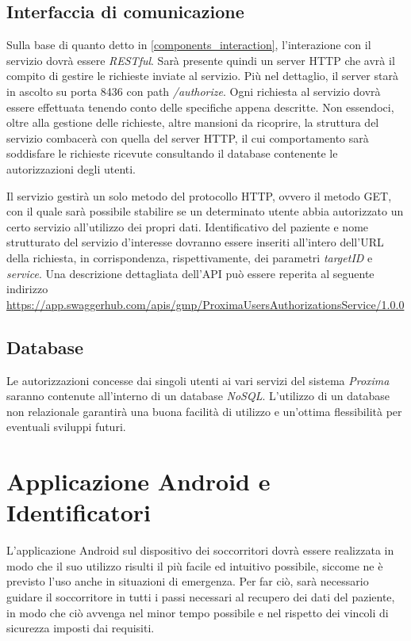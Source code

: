 \documentclass[a4paper,12pt]{report}
\begin{document}
\subsection{Interfaccia di comunicazione}

Sulla base di quanto detto in \autoref{components_interaction}, l'interazione con il servizio dovrà essere \emph{RESTful}. Sarà presente quindi un server HTTP che avrà il compito di gestire le richieste inviate al servizio. Più nel dettaglio, il server starà in ascolto su porta 8436 con path \emph{/authorize}. Ogni richiesta al servizio dovrà essere effettuata tenendo conto delle specifiche appena descritte. Non essendoci, oltre alla gestione delle richieste, altre mansioni da ricoprire, la struttura del servizio combacerà con quella del server HTTP, il cui comportamento sarà soddisfare le richieste ricevute consultando il database contenente le autorizzazioni degli utenti.

Il servizio gestirà un solo metodo del protocollo HTTP, ovvero il metodo GET, con il quale sarà possibile stabilire se un determinato utente abbia autorizzato un certo servizio all'utilizzo dei propri dati. Identificativo del paziente e nome strutturato del servizio d'interesse dovranno essere inseriti all'intero dell'URL della richiesta, in corrispondenza, rispettivamente, dei parametri \emph{targetID} e \emph{service}. Una descrizione dettagliata dell'API può essere reperita al seguente indirizzo \url{https://app.swaggerhub.com/apis/gmp/ProximaUsersAuthorizationsService/1.0.0}

\subsection{Database}

Le autorizzazioni concesse dai singoli utenti ai vari servizi del sistema \emph{Proxima} saranno contenute all'interno di un database \emph{NoSQL}. L'utilizzo di un database non relazionale garantirà una buona facilità di utilizzo e un'ottima flessibilità per eventuali sviluppi futuri.

\section{Applicazione Android e Identificatori} \label{design_app}

L'applicazione Android sul dispositivo dei soccorritori dovrà essere realizzata in modo che il suo utilizzo risulti il più facile ed intuitivo possibile, siccome ne è previsto l'uso anche in situazioni di emergenza. Per far ciò, sarà necessario guidare il soccorritore in tutti i passi necessari al recupero dei dati del paziente, in modo che ciò avvenga nel minor tempo possibile e nel rispetto dei vincoli di sicurezza imposti dai requisiti.
\end{document}
